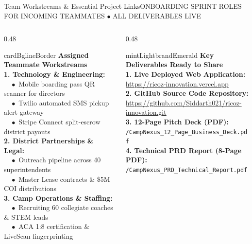 \documentclass[aspectratio=169,9pt]{beamer}
\begin{document}
\begin{frame}{Team Workstreams \& Essential Project Links}{ONBOARDING SPRINT ROLES FOR INCOMING TEAMMATES $\bullet$ ALL DELIVERABLES LIVE}

\begin{columns}[T]
  \begin{column}{0.48\textwidth}
    \begin{execbox}{cardBg}{lineBorder}
      \textcolor{brandNavy}{\textbf{\scriptsize Assigned Teammate Workstreams}} \\[2pt]
      \tiny
      \textbf{1. Technology \& Engineering:} \\
      $\quad\bullet$ Mobile boarding pass QR scanner for directors \\
      $\quad\bullet$ Twilio automated SMS pickup alert gateway \\
      $\quad\bullet$ Stripe Connect split-escrow district payouts \\[2pt]
      \textbf{2. District Partnerships \& Legal:} \\
      $\quad\bullet$ Outreach pipeline across 40 superintendents \\
      $\quad\bullet$ Master Lease contracts \& \$5M COI distributions \\[2pt]
      \textbf{3. Camp Operations \& Staffing:} \\
      $\quad\bullet$ Recruiting 60 collegiate coaches \& STEM leads \\
      $\quad\bullet$ ACA 1:8 certification \& LiveScan fingerprinting
    \end{execbox}
  \end{column}

  \begin{column}{0.48\textwidth}
    \begin{execbox}{mintLight}{brandEmerald}
      \textcolor{brandEmerald}{\textbf{\scriptsize Key Deliverables Ready to Share}} \\[2pt]
      \tiny
      \textbf{1. Live Deployed Web Application:} \\
      \url{https://ricoz-innovation.vercel.app} \\[3pt]
      \textbf{2. GitHub Source Code Repository:} \\
      \url{https://github.com/Siddarth021/ricoz-innovation.git} \\[3pt]
      \textbf{3. 12-Page Pitch Deck (PDF):} \\
      \texttt{/CampNexus\_12\_Page\_Business\_Deck.pdf} \\[3pt]
      \textbf{4. Technical PRD Report (8-Page PDF):} \\
      \texttt{/CampNexus\_PRD\_Technical\_Report.pdf}
    \end{execbox}
  \end{column}
\end{columns}

\end{frame}
\end{document}
